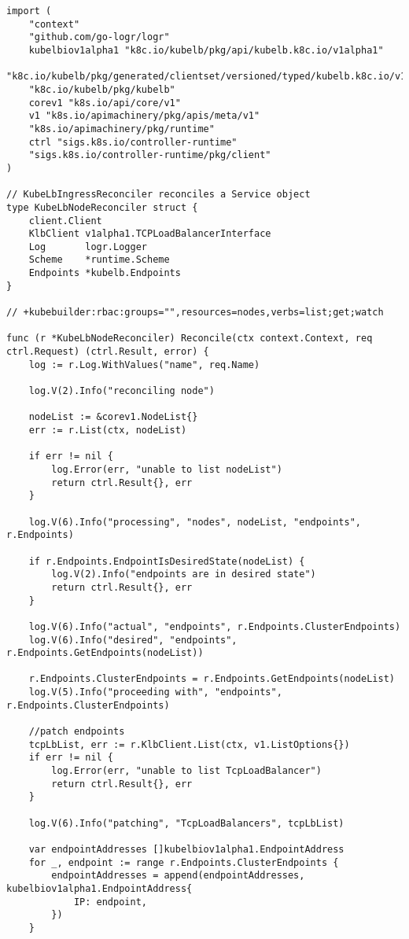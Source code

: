 \begin{lstlisting}[caption={KubeLB Agent node reconciler}, label={lst:nodecontroller-reconcile}]
import (
	"context"
	"github.com/go-logr/logr"
	kubelbiov1alpha1 "k8c.io/kubelb/pkg/api/kubelb.k8c.io/v1alpha1"
	"k8c.io/kubelb/pkg/generated/clientset/versioned/typed/kubelb.k8c.io/v1alpha1"
	"k8c.io/kubelb/pkg/kubelb"
	corev1 "k8s.io/api/core/v1"
	v1 "k8s.io/apimachinery/pkg/apis/meta/v1"
	"k8s.io/apimachinery/pkg/runtime"
	ctrl "sigs.k8s.io/controller-runtime"
	"sigs.k8s.io/controller-runtime/pkg/client"
)

// KubeLbIngressReconciler reconciles a Service object
type KubeLbNodeReconciler struct {
	client.Client
	KlbClient v1alpha1.TCPLoadBalancerInterface
	Log       logr.Logger
	Scheme    *runtime.Scheme
	Endpoints *kubelb.Endpoints
}

// +kubebuilder:rbac:groups="",resources=nodes,verbs=list;get;watch

func (r *KubeLbNodeReconciler) Reconcile(ctx context.Context, req ctrl.Request) (ctrl.Result, error) {
	log := r.Log.WithValues("name", req.Name)

	log.V(2).Info("reconciling node")

	nodeList := &corev1.NodeList{}
	err := r.List(ctx, nodeList)

	if err != nil {
		log.Error(err, "unable to list nodeList")
		return ctrl.Result{}, err
	}

	log.V(6).Info("processing", "nodes", nodeList, "endpoints", r.Endpoints)

	if r.Endpoints.EndpointIsDesiredState(nodeList) {
		log.V(2).Info("endpoints are in desired state")
		return ctrl.Result{}, err
	}

	log.V(6).Info("actual", "endpoints", r.Endpoints.ClusterEndpoints)
	log.V(6).Info("desired", "endpoints", r.Endpoints.GetEndpoints(nodeList))

	r.Endpoints.ClusterEndpoints = r.Endpoints.GetEndpoints(nodeList)
	log.V(5).Info("proceeding with", "endpoints", r.Endpoints.ClusterEndpoints)

	//patch endpoints
	tcpLbList, err := r.KlbClient.List(ctx, v1.ListOptions{})
	if err != nil {
		log.Error(err, "unable to list TcpLoadBalancer")
		return ctrl.Result{}, err
	}

	log.V(6).Info("patching", "TcpLoadBalancers", tcpLbList)

	var endpointAddresses []kubelbiov1alpha1.EndpointAddress
	for _, endpoint := range r.Endpoints.ClusterEndpoints {
		endpointAddresses = append(endpointAddresses, kubelbiov1alpha1.EndpointAddress{
			IP: endpoint,
		})
	}


\end{lstlisting}
